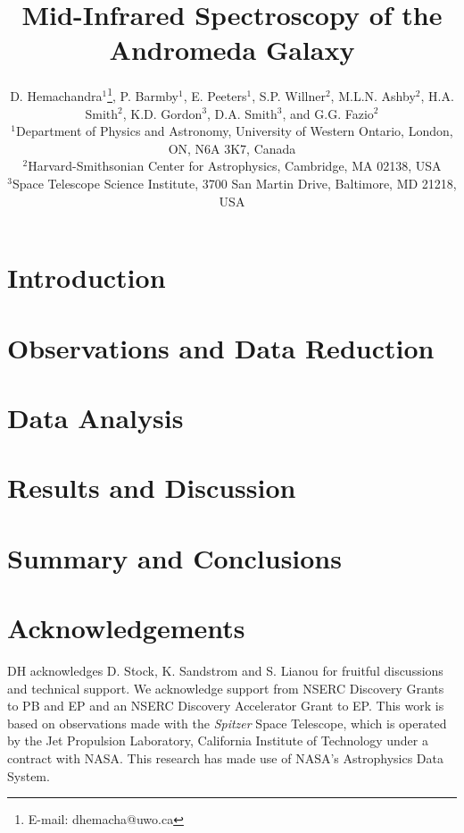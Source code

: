 \documentclass[useAMS,usenatbib,a4paper]{mn2e}
\title[Mid-Infrared Spectroscopy of M31]{Mid-Infrared Spectroscopy of the Andromeda Galaxy}
\author[D. Hemachandra et al.]
{D. Hemachandra$^{1}$\thanks{E-mail: dhemacha@uwo.ca},
P. Barmby$^{1}$, 
E. Peeters$^{1}$, 
S.P. Willner$^{2}$, 
M.L.N. Ashby$^{2}$,
H.A. Smith$^{2}$, 
\newauthor 
K.D. Gordon$^{3}$,
D.A. Smith$^{3}$,
and
G.G. Fazio$^{2}$\\
$^{1}$Department of Physics and Astronomy, University of Western Ontario, London, ON, N6A 3K7, Canada\\
$^{2}$Harvard-Smithsonian Center for Astrophysics, Cambridge, MA 02138, USA\\
$^{3}$Space Telescope Science Institute, 3700 San Martin Drive, Baltimore, MD 21218, USA
}
\begin{document}
\date{}

\maketitle

\label{firstpage}



\section{Introduction}




\section{Observations and Data Reduction}




\section{Data Analysis}



\section{Results and Discussion}



\section{Summary and Conclusions}



\section*{Acknowledgements}


DH acknowledges D. Stock, K. Sandstrom and S. Lianou for fruitful discussions and technical support. 
We acknowledge support from NSERC Discovery Grants to PB and EP and an NSERC Discovery Accelerator Grant to EP. 
This work is based on observations made with the {\em Spitzer} Space Telescope, which is operated by the 
Jet Propulsion Laboratory, California Institute of Technology under a contract with NASA.
This research has made use of NASA's Astrophysics Data System.




{}

\bsp

\label{lastpage}
\end{document}
